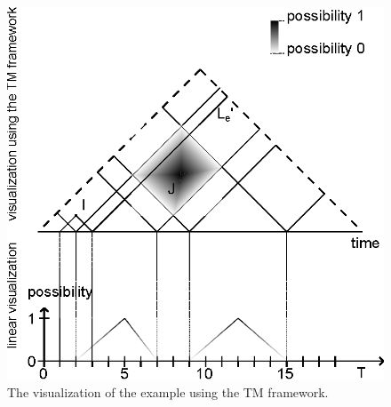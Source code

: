 \begin{figure}[h]
	\centering
	\includegraphics[width=0.9\columnwidth]{graphs/example_image.eps}
	\caption{The visualization of the example using the TM framework.}
	\label{fig:ex}
\end{figure}
\vspace{-5pt}